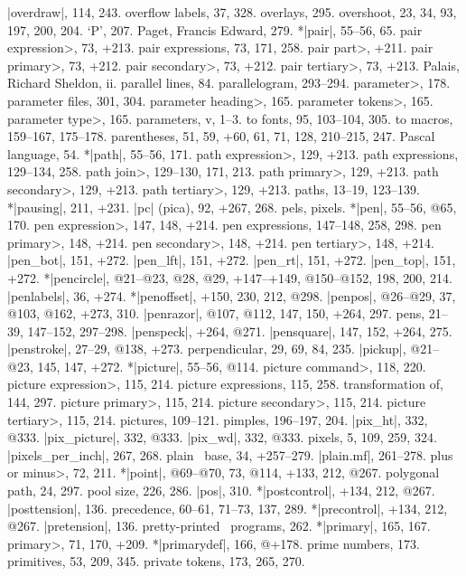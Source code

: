 |overdraw|, 114, 243.
overflow labels, 37, 328.
overlays, 295.
overshoot, 23, 34, 93, 197, 200, 204.
\newletter
`P', 207.
Paget, Francis Edward, 279.
*|pair|, 55--56, 65.
\<pair expression>, 73, +213.
pair expressions, 73, 171, 258.
\<pair part>, +211.
\<pair primary>, 73, +212.
\<pair secondary>, 73, +212.
\<pair tertiary>, 73, +213.
Palais, Richard Sheldon, ii.
parallel lines, 84.
parallelogram, 293--294.
\<parameter>, 178.
parameter files, 301, 304.
\<parameter heading>, 165.
\<parameter tokens>, 165.
\<parameter type>, 165.
parameters, v, 1--3.
\sub to fonts, 95, 103--104, 305.
\sub to macros, 159--167, 175--178.
parentheses, 51, 59, +60, 61, 71, 128, 210--215, 247.
Pascal language, 54.
*|path|, 55--56, 171.
\<path expression>, 129, +213.
path expressions, 129--134, 258.
\<path join>, 129--130, 171, 213.
\<path primary>, 129, +213.
\<path secondary>, 129, +213.
\<path tertiary>, 129, +213.
paths, 13--19, 123--139.
*|pausing|, 211, +231.
|pc| (pica), 92, +267, 268.
pels, \see pixels.
*|pen|, 55--56, @65, 170.
\<pen expression>, 147, 148, +214.
pen expressions, 147--148, 258, 298.
\<pen primary>, 148, +214.
\<pen secondary>, 148, +214.
\<pen tertiary>, 148, +214.
|pen_bot|, 151, +272.
|pen_lft|, 151, +272.
|pen_rt|, 151, +272.
|pen_top|, 151, +272.
*|pencircle|, @21--@23, @28, @29, +147--+149, @150--@152, 198, 200, 214.
|penlabels|, 36, +274.
*|penoffset|, +150, 230, 212, @298.
|penpos|, @26--@29, 37, @103, @162, +273, 310.
|penrazor|, @107, @112, 147, 150, +264, 297.
pens, 21--39, 147--152, 297--298.
|penspeck|, +264, @271.
|pensquare|, 147, 152, +264, 275.
|penstroke|, 27--29, @138, +273.
perpendicular, 29, 69, 84, 235.
|pickup|, @21--@23, 145, 147, +272.
*|picture|, 55--56, @114.
\<picture command>, 118, 220.
\<picture expression>, 115, 214.
picture expressions, 115, 258.
\sub transformation of, 144, 297.
\<picture primary>, 115, 214.
\<picture secondary>, 115, 214.
\<picture tertiary>, 115, 214.
pictures, 109--121.
pimples, 196--197, 204.
|pix_ht|, 332, @333.
|pix_picture|, 332, @333.
|pix_wd|, 332, @333.
pixels, 5, 109, 259, 324.
|pixels_per_inch|, 267, 268.
plain \MF\ base, 34, +257--279.
|plain.mf|, 261--278.
\<plus or minus>, 72, 211.
*|point|, @69--@70, 73, @114, +133, 212, @267.
polygonal path, 24, 297.
pool size, 226, 286.
|pos|, 310.
*|postcontrol|, +134, 212, @267.
|posttension|, 136.
precedence, 60--61, 71--73, 137, 289.
*|precontrol|, +134, 212, @267.
|pretension|, 136.
pretty-printed \MF\ programs, 262.
*|primary|, 165, 167.
\<primary>, 71, 170, +209.
*|primarydef|, 166, @+178.
prime numbers, 173.
primitives, 53, 209, 345.
private tokens, 173, 265, 270.
